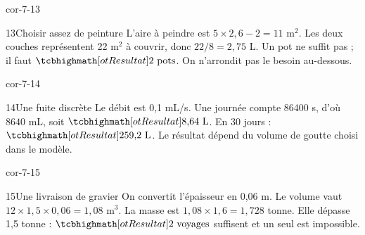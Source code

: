 \begin{blocLivre}{cor-7-13}\begin{corrige}{13}{Choisir assez de peinture}
L’aire à peindre est $5\times2{,}6-2=11$ m$^2$. Les deux couches représentent 22 m$^2$ à couvrir, donc $22/8=2{,}75$ L. Un pot ne suffit pas ; il faut $\res{2\text{ pots}}$. On n’arrondit pas le besoin au-dessous.
\end{corrige}\end{blocLivre}
\begin{blocLivre}{cor-7-14}\begin{corrige}{14}{Une fuite discrète}
Le débit est 0,1 mL/s. Une journée compte 86400 s, d’où $8640$ mL, soit $\res{8{,}64\text{ L}}$. En 30 jours : $\res{259{,}2\text{ L}}$. Le résultat dépend du volume de goutte choisi dans le modèle.
\end{corrige}\end{blocLivre}
\begin{blocLivre}{cor-7-15}\begin{corrige}{15}{Une livraison de gravier}
On convertit l’épaisseur en 0,06 m. Le volume vaut $12\times1{,}5\times0{,}06=1{,}08$ m$^3$. La masse est $1{,}08\times1{,}6=1{,}728$ tonne. Elle dépasse 1,5 tonne : $\res{2\text{ voyages}}$ suffisent et un seul est impossible.
\end{corrige}\end{blocLivre}
